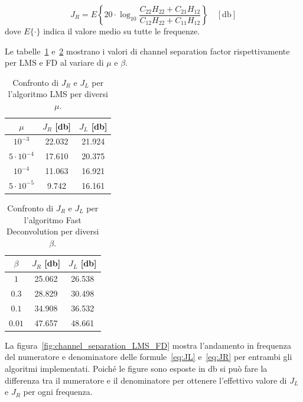 \documentclass[12pt,a4paper,titlepage]{article}
\begin{document}
\begin{equation}\label{eq:JR}
J_R = E\left\{20\cdot\log_{10} \dfrac{C_{22}H_{22}+C_{21}H_{12}}{C_{12}H_{22}+C_{11}H_{12}}\right\} \quad [\si{\decibel}]
\end{equation}
dove $E\{\cdot\}$ indica il valore medio su tutte le frequenze.

Le tabelle~\ref{tab:LMS_result} e~\ref{tab:FD_result} mostrano i valori di channel separation factor rispettivamente per LMS e FD al variare di $\mu$ e $\beta$.

\begin{table}[h]
\centering
\begin{tabular}{c c c}
\toprule
$\mu$   & $J_R$ [\si{\decibel}]   & $J_L$ [\si{\decibel}]   \\ \midrule
$10^{-3}$ & 22.032 & 21.924 \\
$5\cdot10^{-4}$ & 17.610 & 20.375 \\
$10^{-4}$& 11.063 & 16.921 \\
$5\cdot10^{-5}$ & 9.742  & 16.161 \\ \bottomrule
\end{tabular}
\caption{\label{tab:LMS_result}Confronto di $J_R$ e $J_L$ per l'algoritmo LMS per diversi $\mu$.}
\end{table}

\begin{table}[h]
\centering
\begin{tabular}{c c c}
\toprule
$\beta$   & $J_R$ [\si{\decibel}]   & $J_L$ [\si{\decibel}]   \\ \midrule
$1$ &  25.062 &  26.538\\
$0.3$ &  28.829 &  30.498\\
$0.1$&  34.908 & 36.532 \\
$0.01$ &  47.657 &  48.661 \\ \bottomrule
\end{tabular}
\caption{\label{tab:FD_result}Confronto di $J_R$ e $J_L$ per l'algoritmo Fast Deconvolution per diversi $\beta$.}
\end{table}

La figura~\ref{fig:channel_separation_LMS_FD} mostra l'andamento in frequenza del numeratore e denominatore delle formule~\eqref{eq:JL} e~\eqref{eq:JR} per entrambi gli algoritmi implementati. Poiché le figure sono esposte in \si{\decibel} si può fare la differenza tra il numeratore e il denominatore per ottenere l'effettivo valore di $J_L$ e $J_R$ per ogni frequenza.
\end{document}
